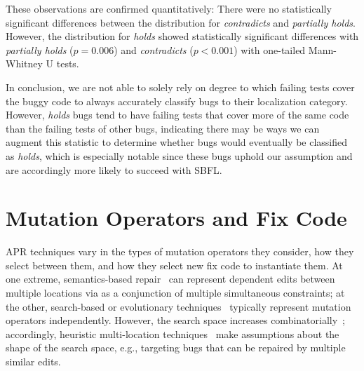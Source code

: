 \documentclass[10pt, conference]{IEEEtran}
\begin{document}
These observations are confirmed quantitatively: There were no statistically significant 
differences between the distribution for \emph{contradicts} and \emph{partially holds}. 
However, the distribution for \emph{holds} showed statistically significant differences with 
\emph{partially holds} ($p = 0.006$)  and \emph{contradicts} ($p < 0.001$) with 
one-tailed Mann-Whitney U tests.

In conclusion, 
we are not able to solely rely on degree to which failing tests cover the buggy 
code to always accurately classify bugs to their localization category.
However, \emph{holds} bugs tend to have failing tests that cover more of the 
same code than the failing tests of other bugs, indicating 
there may be ways we can augment this statistic to determine whether bugs would eventually 
be classified as \emph{holds}, which is 
especially notable since these bugs uphold our assumption and are accordingly more likely to 
succeed with SBFL.
 
\section{Mutation Operators and Fix Code}
\label{sec:mutops}

APR techniques vary in the types of
mutation operators they consider, how they select between them, and how they
select new fix code to instantiate them. 
%
At one extreme, semantics-based repair~\cite{s3,angelix} can represent dependent edits between multiple
locations via as a conjunction of multiple simultaneous constraints; at the other, 
search-based or
evolutionary techniques~\cite{genprog,par} typically represent mutation
operators independently. 
However, the search space increases combinatorially~\cite{ae,long-search-spaces}; accordingly, 
heuristic multi-location
techniques~\cite{saha2019harnessing} make assumptions about the 
shape of the search space, e.g., targeting bugs that can be repaired by multiple similar edits.
\end{document}
